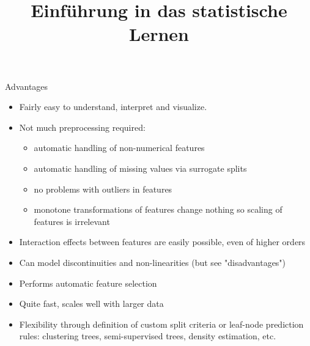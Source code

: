 \documentclass[11pt,compress,t,notes=noshow, xcolor=table]{beamer}
\title{Einführung in das statistische Lernen}
\institute{\href{https://compstat-lmu.github.io/lecture_i2ml/}{compstat-lmu.github.io/lecture\_i2ml}}
\date{}
\begin{document}
















\sloppy

\begin{vbframe}{Advantages}
  \begin{itemize}
    \item Fairly easy to understand, interpret and visualize.
    \item Not much preprocessing required:
    \begin{itemize}
      \item automatic handling of non-numerical features
      \item automatic handling of missing values via surrogate splits
      \item no problems with outliers in features
      \item monotone transformations of features change nothing so scaling of features is irrelevant
    \end{itemize}
    \item Interaction effects between features are easily possible, even of higher orders
    \item Can model discontinuities and non-linearities (but see "disadvantages")

    \framebreak

    \item Performs automatic feature selection
    \item Quite fast, scales well with larger data
    \item Flexibility through definition of custom split criteria or leaf-node prediction rules: clustering trees, semi-supervised trees, density estimation, etc.
  \end{itemize}
\end{vbframe}
\end{document}
